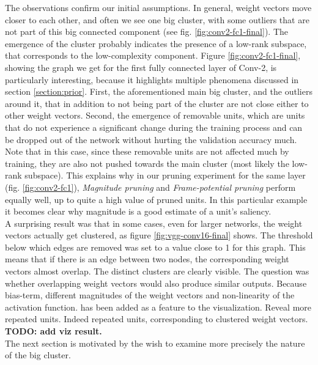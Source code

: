 The observations confirm our initial assumptions. In general, weight vectors move closer to each other, and often we see one big cluster, with some outliers that are not part of this big connected component (see fig. \ref{fig:conv2-fc1-final}). The emergence of the cluster probably indicates the presence of a low-rank subspace, that corresponds to the low-complexity component. Figure \ref{fig:conv2-fc1-final}, showing the graph we get for the first fully connected layer of Conv-2, is particularly interesting, because it highlights multiple phenomena discussed in section \ref{section:prior}. First, the aforementioned main big cluster, and the outliers around it, that in addition to not being part of the cluster are not close either to other weight vectors. Second, the emergence of removable units, which are units that do not experience a significant change during the training process and can be dropped out of the network without hurting the validation accuracy much. Note that in this case, since these removable units are not affected much by training, they are also not pushed towards the main cluster (most likely the low-rank subspace). This explains why in our pruning experiment for the same layer (fig. \ref{fig:conv2-fc1}), \textit{Magnitude pruning} and \textit{Frame-potential pruning} perform equally well, up to quite a high value of pruned units. In this particular example it becomes clear why magnitude is a good estimate of a unit's saliency. \\

A surprising result was that in some cases, even for larger networks, the weight vectors actually get clustered, as figure \ref{fig:vgg-conv16-final} shows. The threshold below which edges are removed was set to a value close to 1 for this graph. This means that if there is an edge between two nodes, the corresponding weight vectors almost overlap. The distinct clusters are clearly visible. The question was whether overlapping weight vectors would also produce similar outputs. Because bias-term, different magnitudes of the weight vectors and non-linearity of the activation function. has been added as a feature to the visualization. Reveal more repeated units. Indeed repeated units, corresponding to clustered weight vectors. \textbf{TODO: add viz result.} \\

The next section is motivated by the wish to examine more precisely the nature of the big cluster.

